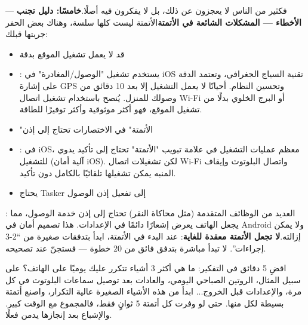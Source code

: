
— فكثير من الناس لا يعجزون عن ذلك، بل لا يفكرون فيه أصلًا.\textbf{خامسًا: دليل تجنب الأخطاء — المشكلات الشائعة في الأتمتة}الأتمتة ليست كلها سلسة، وهناك بعض الحفر جربتها قبلك:

\begin{itemize}
  \item قد لا يعمل تشغيل الموقع بدقة
  \item : يستخدم تشغيل "الوصول/المغادرة" في iOS تقنية السياج الجغرافي، وتعتمد الدقة على إشارة GPS وتحسين النظام. أحيانًا لا يعمل التشغيل إلا بعد 10 دقائق من وصولك للمنزل. يُنصح باستخدام تشغيل اتصال Wi-Fi أو البرج الخلوي بدلًا من تشغيل الموقع، فهو أكثر موثوقية وأكثر توفيرًا للطاقة.
  \item "الأتمتة" في الاختصارات تحتاج إلى إذن
  \item : في iOS، معظم عمليات التشغيل في علامة تبويب "الأتمتة" تحتاج إلى تأكيد يدوي للتشغيل (آلية أمان iOS). لكن تشغيلات اتصال Wi-Fi واتصال البلوتوث وإيقاف المنبه يمكن تشغيلها تلقائيًا بالكامل دون تأكيد.
  \item يحتاج Tasker إلى تفعيل إذن الوصول
\end{itemize}

: العديد من الوظائف المتقدمة (مثل محاكاة النقر) تحتاج إلى إذن خدمة الوصول، مما يجعل الهاتف يعرض إشعارًا دائمًا في الإعدادات. هذا تصميم أمان في Android ولا يمكن إزالته.\textbf{لا تجعل الأتمتة معقدة للغاية}: عند البدء في الأتمتة، ابدأ بتدفقات صغيرة من “2-3 إجراءات”. لا تبدأ مباشرة بتدفق فائق من 20 خطوة — فستجنّ عند تصحيحه.


اقضِ 5 دقائق في التفكير: ما هي أكثر 3 أشياء تتكرر عليك يوميًا على الهاتف؟ على سبيل المثال، الروتين الصباحي اليومي، والعادات بعد توصيل سماعات البلوتوث في كل مرة، والإعدادات قبل الخروج... ابدأ من هذه الأشياء الصغيرة عالية التكرار، واصنع أتمتة بسيطة لكل منها. حتى لو وفرت كل أتمتة 5 ثوانٍ فقط، فالمجموع مع الوقت كبير. والإشباع بعد إنجازها يدمن فعلًا.

